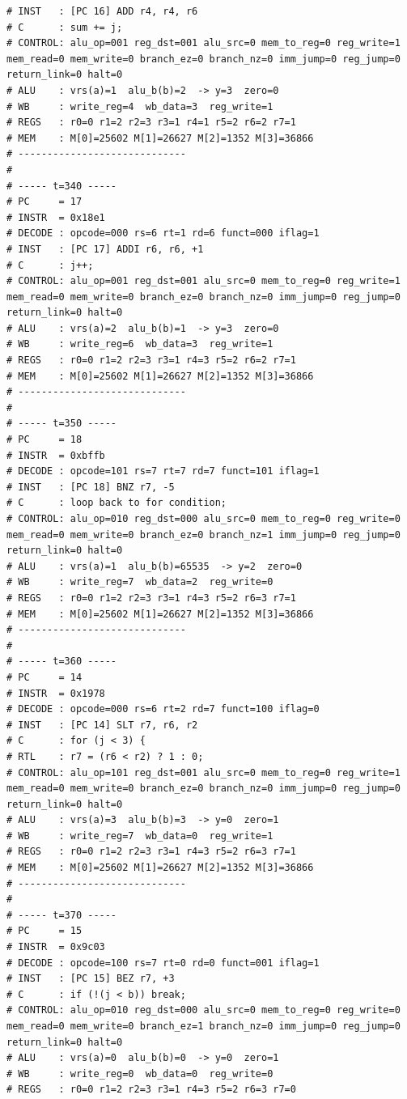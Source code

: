 \documentclass[12pt]{report}
\begin{document}
\begin{lstlisting}
# INST   : [PC 16] ADD r4, r4, r6
# C      : sum += j;
# CONTROL: alu_op=001 reg_dst=001 alu_src=0 mem_to_reg=0 reg_write=1 mem_read=0 mem_write=0 branch_ez=0 branch_nz=0 imm_jump=0 reg_jump=0 return_link=0 halt=0
# ALU    : vrs(a)=1  alu_b(b)=2  -> y=3  zero=0
# WB     : write_reg=4  wb_data=3  reg_write=1
# REGS   : r0=0 r1=2 r2=3 r3=1 r4=1 r5=2 r6=2 r7=1
# MEM    : M[0]=25602 M[1]=26627 M[2]=1352 M[3]=36866
# -----------------------------
# 
# ----- t=340 -----
# PC     = 17
# INSTR  = 0x18e1
# DECODE : opcode=000 rs=6 rt=1 rd=6 funct=000 iflag=1
# INST   : [PC 17] ADDI r6, r6, +1
# C      : j++;
# CONTROL: alu_op=001 reg_dst=001 alu_src=0 mem_to_reg=0 reg_write=1 mem_read=0 mem_write=0 branch_ez=0 branch_nz=0 imm_jump=0 reg_jump=0 return_link=0 halt=0
# ALU    : vrs(a)=2  alu_b(b)=1  -> y=3  zero=0
# WB     : write_reg=6  wb_data=3  reg_write=1
# REGS   : r0=0 r1=2 r2=3 r3=1 r4=3 r5=2 r6=2 r7=1
# MEM    : M[0]=25602 M[1]=26627 M[2]=1352 M[3]=36866
# -----------------------------
# 
# ----- t=350 -----
# PC     = 18
# INSTR  = 0xbffb
# DECODE : opcode=101 rs=7 rt=7 rd=7 funct=101 iflag=1
# INST   : [PC 18] BNZ r7, -5
# C      : loop back to for condition;
# CONTROL: alu_op=010 reg_dst=000 alu_src=0 mem_to_reg=0 reg_write=0 mem_read=0 mem_write=0 branch_ez=0 branch_nz=1 imm_jump=0 reg_jump=0 return_link=0 halt=0
# ALU    : vrs(a)=1  alu_b(b)=65535  -> y=2  zero=0
# WB     : write_reg=7  wb_data=2  reg_write=0
# REGS   : r0=0 r1=2 r2=3 r3=1 r4=3 r5=2 r6=3 r7=1
# MEM    : M[0]=25602 M[1]=26627 M[2]=1352 M[3]=36866
# -----------------------------
# 
# ----- t=360 -----
# PC     = 14
# INSTR  = 0x1978
# DECODE : opcode=000 rs=6 rt=2 rd=7 funct=100 iflag=0
# INST   : [PC 14] SLT r7, r6, r2
# C      : for (j < 3) {
# RTL    : r7 = (r6 < r2) ? 1 : 0;
# CONTROL: alu_op=101 reg_dst=001 alu_src=0 mem_to_reg=0 reg_write=1 mem_read=0 mem_write=0 branch_ez=0 branch_nz=0 imm_jump=0 reg_jump=0 return_link=0 halt=0
# ALU    : vrs(a)=3  alu_b(b)=3  -> y=0  zero=1
# WB     : write_reg=7  wb_data=0  reg_write=1
# REGS   : r0=0 r1=2 r2=3 r3=1 r4=3 r5=2 r6=3 r7=1
# MEM    : M[0]=25602 M[1]=26627 M[2]=1352 M[3]=36866
# -----------------------------
# 
# ----- t=370 -----
# PC     = 15
# INSTR  = 0x9c03
# DECODE : opcode=100 rs=7 rt=0 rd=0 funct=001 iflag=1
# INST   : [PC 15] BEZ r7, +3
# C      : if (!(j < b)) break;
# CONTROL: alu_op=010 reg_dst=000 alu_src=0 mem_to_reg=0 reg_write=0 mem_read=0 mem_write=0 branch_ez=1 branch_nz=0 imm_jump=0 reg_jump=0 return_link=0 halt=0
# ALU    : vrs(a)=0  alu_b(b)=0  -> y=0  zero=1
# WB     : write_reg=0  wb_data=0  reg_write=0
# REGS   : r0=0 r1=2 r2=3 r3=1 r4=3 r5=2 r6=3 r7=0

\end{lstlisting}
\end{document}
